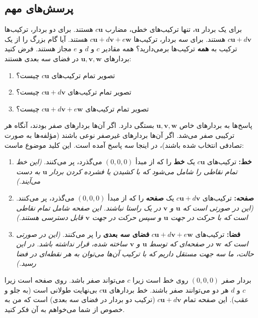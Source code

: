 \documentclass[12pt, a4paper]{book}
\begin{document}
	\subsection*{پرسش‌های مهم}
	برای یک بردار $\mathbf{u}$، تنها ترکیب‌های خطی، مضارب $c\mathbf{u}$ هستند. برای دو بردار، ترکیب‌ها $c\mathbf{u} + d\mathbf{v}$ هستند. برای سه بردار، ترکیب‌ها $c\mathbf{u} + d\mathbf{v} + e\mathbf{w}$ هستند.
	آیا گام بزرگ را از یک ترکیب به \textbf{همه} ترکیب‌ها برمی‌دارید؟ همه مقادیر $c$ و $d$ و $e$ مجاز هستند. فرض کنید بردارهای $\mathbf{u}, \mathbf{v}, \mathbf{w}$ در فضای سه بعدی هستند:
	\begin{enumerate}
		\item تصویر تمام ترکیب‌های $c\mathbf{u}$ چیست؟
		\item تصویر تمام ترکیب‌های $c\mathbf{u} + d\mathbf{v}$ چیست؟
		\item تصویر تمام ترکیب‌های $c\mathbf{u} + d\mathbf{v} + e\mathbf{w}$ چیست؟
	\end{enumerate}
	پاسخ‌ها به بردارهای خاص $\mathbf{u}, \mathbf{v}, \mathbf{w}$ بستگی دارد. اگر آن‌ها بردارهای صفر بودند، آنگاه هر ترکیبی صفر می‌شد. اگر آن‌ها بردارهای غیرصفر نوعی باشند (مؤلفه‌ها به صورت تصادفی انتخاب شده باشند)، در اینجا سه پاسخ آمده است. این کلید موضوع ماست:
	\begin{enumerate}
		\item \textbf{خط:} ترکیب‌های $c\mathbf{u}$ یک \textbf{خط} را که از مبدأ $(0,0,0)$ می‌گذرد، پر می‌کنند. \textit{(این خط تمام نقاطی را شامل می‌شود که با کشیدن یا فشرده کردن بردار $\mathbf{u}$ به دست می‌آیند.)}
		\item \textbf{صفحه:} ترکیب‌های $c\mathbf{u} + d\mathbf{v}$ یک \textbf{صفحه} را که از مبدأ $(0,0,0)$ می‌گذرد، پر می‌کنند. \textit{(این در صورتی است که $\mathbf{u}$ و $\mathbf{v}$ در یک راستا نباشند. این صفحه شامل تمام نقاطی است که با حرکت در جهت $\mathbf{u}$ و سپس حرکت در جهت $\mathbf{v}$ قابل دسترسی هستند.)}
		\item \textbf{فضا:} ترکیب‌های $c\mathbf{u} + d\mathbf{v} + e\mathbf{w}$ \textbf{فضای سه بعدی} را پر می‌کنند. \textit{(این در صورتی است که $\mathbf{w}$ در صفحه‌ای که توسط $\mathbf{u}$ و $\mathbf{v}$ ساخته شده، قرار نداشته باشد. در این حالت، ما سه جهت مستقل داریم که با ترکیب آن‌ها می‌توان به هر نقطه‌ای در فضا رسید.)}
	\end{enumerate}
	بردار صفر $(0,0,0)$ روی خط است زیرا $c$ می‌تواند صفر باشد. روی صفحه است زیرا $c$ و $d$ هر دو می‌توانند صفر باشند. خط بردارهای $c\mathbf{u}$ بی‌نهایت طولانی است (به جلو و عقب). این صفحه تمام $c\mathbf{u} + d\mathbf{v}$ (ترکیب دو بردار در فضای سه بعدی) است که من به خصوص از شما می‌خواهم به آن فکر کنید.
	
\end{document}
